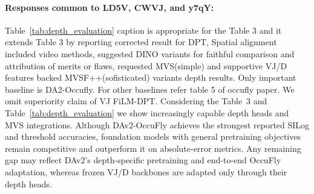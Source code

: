 \documentclass[10pt,twocolumn,letterpaper]{article}
\begin{document}
\paragraph{Responses common to LD5V, CWVJ, and y7qY:}
 Table~\ref{tab:depth_evaluation} caption is appropriate for the Table 3 and it extends Table 3 by reporting corrected result for DPT, Spatial alignment included video methods, suggested DINO variants for faithful comparison and attribution of merits or flaws, requested MVS(simple) and supportive VJ/D features backed MVSF++(sofisticated) variants depth results.  Only important baseline is DA2-Occufly. For other baselines refer table 5 of occufly paper. We omit superiority claim of VJ FiLM-DPT. Considering the Table~3 and Table~\ref{tab:depth_evaluation} we show increasingly capable depth heads and MVS integrations. Although DAv2-OccuFly achieves the strongest reported SILog and threshold accuracies, foundation models with general pretraining objectives remain competitive and outperform it on absolute-error metrics. Any remaining gap may reflect DAv2’s depth-specific pretraining and end-to-end OccuFly adaptation, whereas frozen VJ/D backbones are adapted only through their depth heads.

\begin{table}[t]
  \caption{\textbf{Altitude interpolation diagnostics.} }
  \label{tab:altitude-interpolation-control}
  \centering
  \footnotesize
  \setlength{\tabcolsep}{2.2pt}
\end{table}
\end{document}

